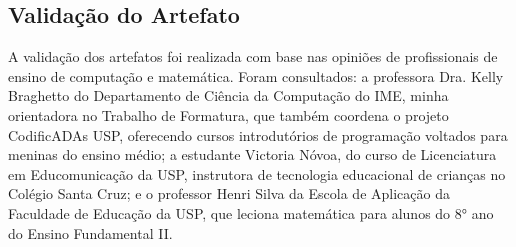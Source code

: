 


\subsection{Validação do Artefato} \label{validation}
A validação dos artefatos foi realizada com base nas opiniões de profissionais de ensino de computação e matemática. Foram consultados: a professora Dra. Kelly Braghetto do Departamento de Ciência da Computação do IME, minha orientadora no Trabalho de Formatura, que também coordena o projeto CodificADAs USP, oferecendo cursos introdutórios de programação voltados para meninas do ensino médio; a estudante Victoria Nóvoa, do curso de Licenciatura em Educomunicação da USP, instrutora de tecnologia educacional de crianças no Colégio Santa Cruz; e o professor Henri Silva da Escola de Aplicação da Faculdade de Educação da USP, que leciona matemática para alunos do 8° ano do Ensino Fundamental II.

